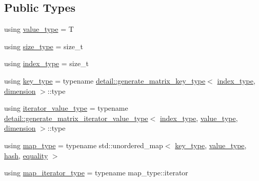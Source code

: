 \subsection*{Public Types}
\begin{DoxyCompactItemize}
\item 
using \hyperlink{structmatrix_1_1matrix_ab940e7a84942339cdee7c0f0d3bd8ef9}{value\+\_\+type} = T
\item 
using \hyperlink{structmatrix_1_1matrix_aebc6efd587a1c3f0a951631d6ee6837f}{size\+\_\+type} = size\+\_\+t
\item 
using \hyperlink{structmatrix_1_1matrix_a87b61e7f35dcd5991cd3f243cfeced06}{index\+\_\+type} = size\+\_\+t
\item 
using \hyperlink{structmatrix_1_1matrix_af7b5498ac1b615cb9ef51bd185a2557e}{key\+\_\+type} = typename \hyperlink{classmatrix_1_1detail_1_1generate__matrix__key__type}{detail\+::generate\+\_\+matrix\+\_\+key\+\_\+type}$<$ \hyperlink{structmatrix_1_1matrix_a87b61e7f35dcd5991cd3f243cfeced06}{index\+\_\+type}, \hyperlink{structmatrix_1_1matrix_a7d76bd51fd998974f59ea4035e053f74}{dimension} $>$\+::type
\item 
using \hyperlink{structmatrix_1_1matrix_a1de5c69f5d9e3b6d3e54b1e4cb433d65}{iterator\+\_\+value\+\_\+type} = typename \hyperlink{classmatrix_1_1detail_1_1generate__matrix__iterator__value__type}{detail\+::generate\+\_\+matrix\+\_\+iterator\+\_\+value\+\_\+type}$<$ \hyperlink{structmatrix_1_1matrix_a87b61e7f35dcd5991cd3f243cfeced06}{index\+\_\+type}, \hyperlink{structmatrix_1_1matrix_ab940e7a84942339cdee7c0f0d3bd8ef9}{value\+\_\+type}, \hyperlink{structmatrix_1_1matrix_a7d76bd51fd998974f59ea4035e053f74}{dimension} $>$\+::type
\item 
using \hyperlink{structmatrix_1_1matrix_a435a771dfb8b36e4cbc5ec09cf391796}{map\+\_\+type} = typename std\+::unordered\+\_\+map$<$ \hyperlink{structmatrix_1_1matrix_af7b5498ac1b615cb9ef51bd185a2557e}{key\+\_\+type}, \hyperlink{structmatrix_1_1matrix_ab940e7a84942339cdee7c0f0d3bd8ef9}{value\+\_\+type}, \hyperlink{structmatrix_1_1matrix_1_1hash}{hash}, \hyperlink{structmatrix_1_1matrix_1_1equality}{equality} $>$
\item 
using \hyperlink{structmatrix_1_1matrix_a718c745a811e13b64ba21239288666a6}{map\+\_\+iterator\+\_\+type} = typename map\+\_\+type\+::iterator
\end{DoxyCompactItemize}
